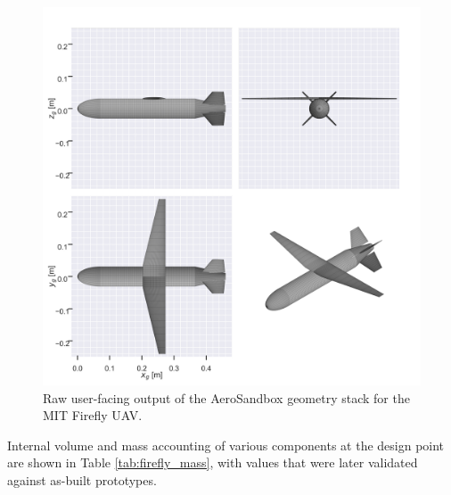 \begin{figure}[H]
    \centering
    \includegraphics[width=\textwidth]{../figures/firefly_geometry.png}
    \caption{Raw user-facing output of the AeroSandbox geometry stack for the MIT Firefly UAV.}
    \label{fig:firefly_geometry}
\end{figure}

Internal volume and mass accounting of various components at the design point are shown in Table \ref{tab:firefly_mass}, with values that were later validated against as-built prototypes.

